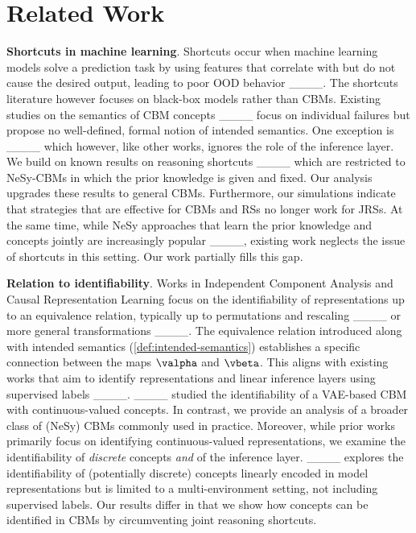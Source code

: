 \section{Related Work}
\label{sec:related-work}


\textbf{Shortcuts in machine learning}.  Shortcuts occur when machine learning models solve a prediction task by using features that correlate with but do not cause the desired output, leading to poor OOD behavior ____.  The shortcuts literature however focuses on black-box models rather than CBMs.
Existing studies on the semantics of CBM concepts ____ focus on individual failures but propose no well-defined, formal notion of intended semantics.  One exception is ____ which however, like other works, ignores the role of the inference layer.
We build on known results on reasoning shortcuts ____ which are restricted to NeSy-CBMs in which the prior knowledge is given and fixed.  Our analysis upgrades these results to general CBMs.  Furthermore, our simulations indicate that strategies that are effective for CBMs and RSs no longer work for JRSs.
At the same time, while NeSy approaches that learn the prior knowledge and concepts jointly are increasingly popular ____, existing work neglects the issue of shortcuts in this setting.  Our work partially fills this gap.


\textbf{Relation to identifiability}.  Works in Independent Component Analysis and Causal Representation Learning focus on the identifiability of representations up to an equivalence relation, typically up to permutations and rescaling ____ or more general transformations ____.
The equivalence relation introduced along with intended semantics (\cref{def:intended-semantics}) establishes a specific connection between the maps $\valpha$ and $\vbeta$. This aligns with existing works that aim to identify representations and linear inference layers using supervised labels ____.  
____ studied the identifiability of a VAE-based CBM with continuous-valued concepts.  In contrast, we provide an analysis of a broader class of (NeSy) CBMs commonly used in practice.
Moreover, while prior works primarily focus on identifying continuous-valued representations, we examine the identifiability of \textit{discrete} concepts \textit{and} of the inference layer.
____ explores the identifiability of (potentially discrete) concepts linearly encoded in model representations but is limited to a multi-environment setting, not including supervised labels.  Our results differ in that we show how concepts can be identified in CBMs by circumventing joint reasoning shortcuts.